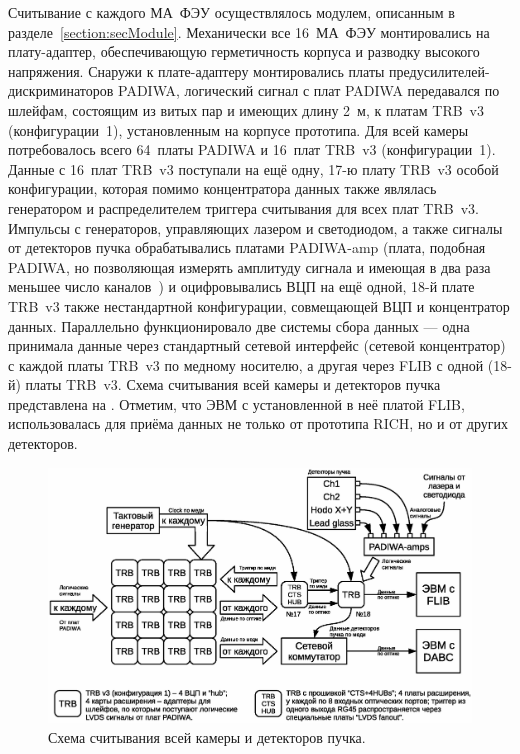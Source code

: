 Считывание с каждого МА~ФЭУ осуществлялось модулем, описанным в разделе~\ref{section:secModule}. Механически все 16~МА~ФЭУ монтировались на плату-адаптер, обеспечивающую герметичность корпуса и разводку высокого напряжения. Снаружи к плате-адаптеру монтировались платы предусилителей-дискриминаторов PADIWA, логический сигнал с плат PADIWA передавался по шлейфам, состоящим из витых пар и имеющих длину 2~м, к платам TRB~v3 (конфигурации~1), установленным на корпусе прототипа. Для всей камеры потребовалось всего 64~платы PADIWA и 16~плат TRB~v3 (конфигурации~1). Данные с 16~плат TRB~v3 поступали на ещё одну, 17-ю плату TRB~v3 особой конфигурации, которая помимо концентратора данных также являлась генератором и распределителем триггера считывания для всех плат TRB~v3. Импульсы с генераторов, управляющих лазером и светодиодом, а также сигналы от детекторов пучка обрабатывались платами PADIWA-amp (плата, подобная PADIWA, но позволяющая измерять амплитуду сигнала и имеющая в два раза меньшее число каналов~\cite{TRBSITE}) и оцифровывались ВЦП на ещё одной, 18-й плате TRB~v3 также нестандартной конфигурации, совмещающей ВЦП и концентратор данных. Параллельно функционировало две системы сбора данных --- одна принимала данные через стандартный сетевой интерфейс (сетевой концентратор) с каждой платы TRB~v3 по медному носителю, а другая через FLIB с одной (18-й) платы TRB~v3. Схема считывания всей камеры и детекторов пучка представлена на . Отметим, что ЭВМ с установленной в неё платой FLIB, использовалась для приёма данных не только от прототипа RICH, но и от других детекторов.

\begin{figure}[H]
\centering
\includegraphics[width=1.0\textwidth]{pictures/11_Beamtime_readout_chain.eps}
\caption{Схема считывания всей камеры и детекторов пучка.}
\label{fig:BeamtimeReadout}
\end{figure}
